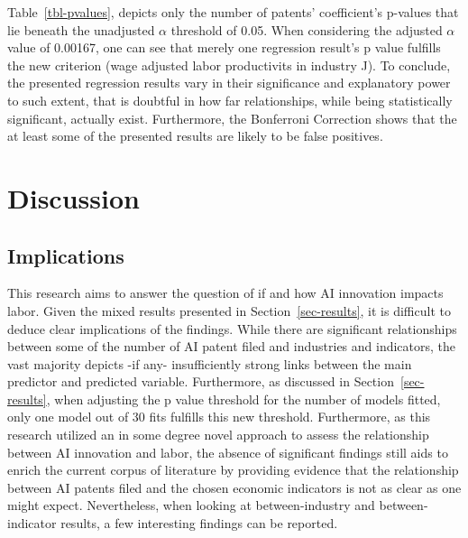 \documentclass[
  11,
  a4paperpaper,
]{article}
\let\oldsection\section
\renewcommand\section{\clearpage\oldsection}
\begin{document}

Table~\ref{tbl-pvalues}, depicts only the number of patents'
coefficient's p-values that lie beneath the unadjusted \(\alpha\)
threshold of 0.05. When considering the adjusted \(\alpha\) value of
0.00167, one can see that merely one regression result's p value
fulfills the new criterion (wage adjusted labor productivits in industry
J). To conclude, the presented regression results vary in their
significance and explanatory power to such extent, that is doubtful in
how far relationships, while being statistically significant, actually
exist. Furthermore, the Bonferroni Correction shows that the at least
some of the presented results are likely to be false positives.

\section{Discussion}\label{sec-discussion}

\subsection{Implications}\label{implications}

This research aims to answer the question of if and how AI innovation
impacts labor. Given the mixed results presented in
Section~\ref{sec-results}, it is difficult to deduce clear implications
of the findings. While there are significant relationships between some
of the number of AI patent filed and industries and indicators, the vast
majority depicts -if any- insufficiently strong links between the main
predictor and predicted variable. Furthermore, as discussed in
Section~\ref{sec-results}, when adjusting the p value threshold for the
number of models fitted, only one model out of 30 fits fulfills this new
threshold. Furthermore, as this research utilized an in some degree
novel approach to assess the relationship between AI innovation and
labor, the absence of significant findings still aids to enrich the
current corpus of literature by providing evidence that the relationship
between AI patents filed and the chosen economic indicators is not as
clear as one might expect. Nevertheless, when looking at
between-industry and between-indicator results, a few interesting
findings can be reported.

\end{document}
